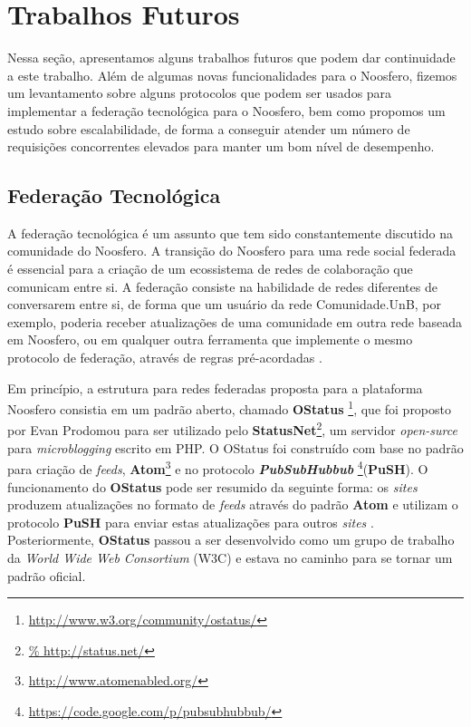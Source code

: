 \section{Trabalhos Futuros}
\label{sec:future-works}

Nessa seção, apresentamos alguns trabalhos futuros que podem dar continuidade a
este trabalho. Além de algumas novas funcionalidades para o Noosfero, fizemos
um levantamento sobre alguns protocolos que podem ser usados para implementar a
federação tecnológica para o Noosfero, bem como propomos um estudo sobre
escalabilidade, de forma a conseguir atender um número de requisições
concorrentes elevados para manter um bom nível de desempenho.

\subsection{Federação Tecnológica}

A federação tecnológica é um assunto que tem sido constantemente discutido
na comunidade do Noosfero. A transição do Noosfero para uma rede social federada
é essencial para a criação de um ecossistema de redes de colaboração que
comunicam entre si.
%
A federação consiste na habilidade de redes diferentes de conversarem entre si,
de forma que um usuário da rede Comunidade.UnB, por exemplo, poderia receber
atualizações de uma comunidade em outra rede baseada em Noosfero, ou em
qualquer outra ferramenta que implemente o mesmo protocolo de federação,
através de regras pré-acordadas \cite{prodomou2010}.

Em princípio, a estrutura para redes federadas proposta para a plataforma Noosfero
consistia em um padrão aberto, chamado \textbf{OStatus}%
\footnote{\url{http://www.w3.org/community/ostatus/}}, que foi proposto
por Evan Prodomou para ser utilizado pelo \textbf{StatusNet}\footnote{\url{%
http://status.net/}}, um servidor  \textit{open-surce} para
\textit{microblogging} escrito em PHP.
%
O OStatus foi construído com base no padrão para criação de \textit{feeds},
\textbf{Atom}\footnote{\url{http://www.atomenabled.org/}} e no
protocolo \textbf{\textit{PubSubHubbub}}%
\footnote{\url{https://code.google.com/p/pubsubhubbub/}}(\textbf{PuSH}).
%
O funcionamento do \textbf{OStatus} pode ser resumido da seguinte forma:
os \textit{sites} produzem atualizações no formato de \textit{feeds} através
do padrão \textbf{Atom} e utilizam o protocolo \textbf{PuSH}
para enviar estas atualizações para outros \textit{sites} \cite{OStatusBasics}.
%
Posteriormente, \textbf{OStatus} passou a ser desenvolvido como um
grupo de trabalho da \textit{World Wide Web Consortium} (W3C) e estava no
caminho para se tornar um padrão oficial.

